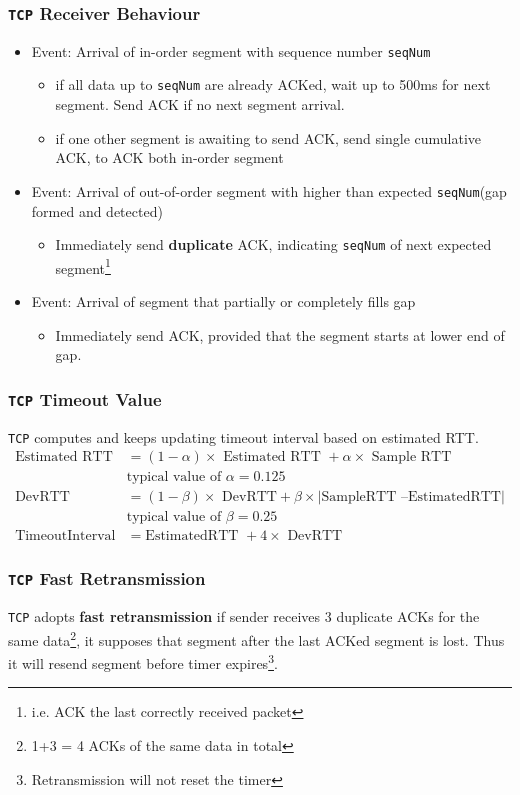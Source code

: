 \documentclass[12pt]{article}
\newcommand\TCP{\texttt{TCP} }
\theoremstyle{definition}
\begin{document}
\subsubsection{\TCP Receiver Behaviour}
\begin{itemize}
  \item Event: Arrival of in-order segment with sequence number \texttt{seqNum}
  \begin{itemize}
    \item if all data up to \texttt{seqNum} are already ACKed, wait up to 500ms for next segment. Send ACK if no next segment arrival.
    \item if one other segment is awaiting to send ACK, send single cumulative ACK, to ACK both in-order segment
    \end{itemize}
  \item Event: Arrival of out-of-order segment with higher than expected \texttt{seqNum}(gap formed and detected)
  \begin{itemize}
  \item Immediately send \textbf{duplicate} ACK, indicating \texttt{seqNum} of next expected segment\footnote{i.e. ACK the last correctly received packet}
  \end{itemize}
  \item Event: Arrival of segment that partially or completely fills gap
  \begin{itemize}
  \item Immediately send ACK, provided that the segment starts at lower end of gap.
  \end{itemize}
  \end{itemize} 
  \subsubsection{\TCP Timeout Value}
  \TCP computes and keeps updating timeout interval based on estimated RTT.
  \begin{align*}
  \text{Estimated RTT} &= (1-\alpha)\times\text{ Estimated RTT }+\alpha\times\text{ Sample RTT}\\
  &\text{typical value of }\alpha = 0.125\\
  \text{DevRTT} &= (1-\beta)\times\text{ DevRTT}+\beta\times|\text{SampleRTT --EstimatedRTT}|\\
  &\text{typical value of }\beta = 0.25\\
  \text{TimeoutInterval} &=\text{EstimatedRTT } +4\times\text{ DevRTT}
  \end{align*}
  \subsubsection{\TCP Fast Retransmission}
  \TCP adopts \textbf{fast retransmission} if sender receives 3 duplicate ACKs for the same data\footnote{1+3 = 4 ACKs of the same data in total}, it supposes that  segment after the last ACKed segment is lost. Thus it will resend segment before timer expires\footnote{Retransmission will not reset the timer}.
\end{document}
